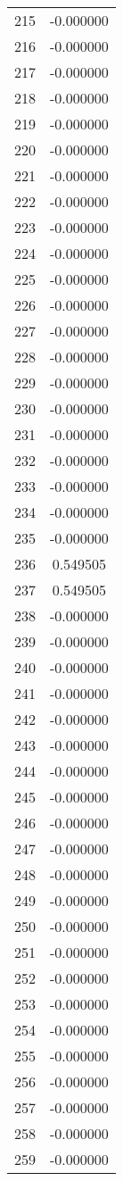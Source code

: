 \documentclass[12pt]{article}
\begin{document}
\begin{longtable}{@{}cc@{}}
215 & -0.000000 \\
216 & -0.000000 \\
217 & -0.000000 \\
218 & -0.000000 \\
219 & -0.000000 \\
220 & -0.000000 \\
221 & -0.000000 \\
222 & -0.000000 \\
223 & -0.000000 \\
224 & -0.000000 \\
225 & -0.000000 \\
226 & -0.000000 \\
227 & -0.000000 \\
228 & -0.000000 \\
229 & -0.000000 \\
230 & -0.000000 \\
231 & -0.000000 \\
232 & -0.000000 \\
233 & -0.000000 \\
234 & -0.000000 \\
235 & -0.000000 \\
236 & 0.549505 \\
237 & 0.549505 \\
238 & -0.000000 \\
239 & -0.000000 \\
240 & -0.000000 \\
241 & -0.000000 \\
242 & -0.000000 \\
243 & -0.000000 \\
244 & -0.000000 \\
245 & -0.000000 \\
246 & -0.000000 \\
247 & -0.000000 \\
248 & -0.000000 \\
249 & -0.000000 \\
250 & -0.000000 \\
251 & -0.000000 \\
252 & -0.000000 \\
253 & -0.000000 \\
254 & -0.000000 \\
255 & -0.000000 \\
256 & -0.000000 \\
257 & -0.000000 \\
258 & -0.000000 \\
259 & -0.000000 \\

\end{longtable}
\end{document}
